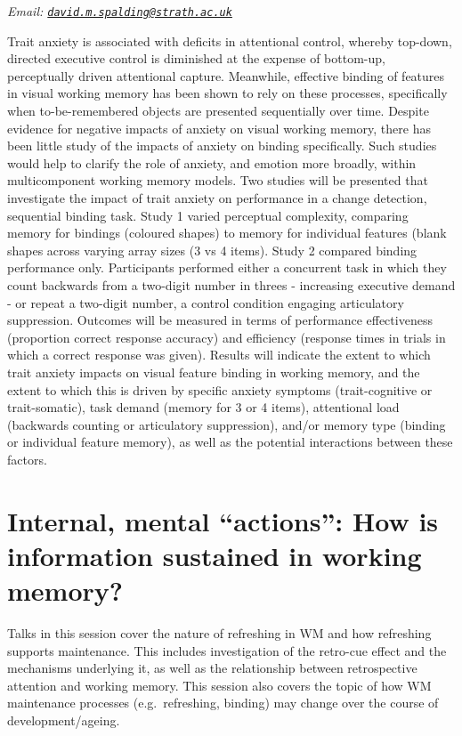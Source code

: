 \documentclass[
  12pt,
]{book}
\begin{document}
\emph{Email: \href{mailto:david.m.spalding@strath.ac.uk}{\nolinkurl{david.m.spalding@strath.ac.uk}}}

Trait anxiety is associated with deficits in attentional control, whereby top-down, directed executive control is diminished at the expense of bottom-up, perceptually driven attentional capture. Meanwhile, effective binding of features in visual working memory has been shown to rely on these processes, specifically when to-be-remembered objects are presented sequentially over time. Despite evidence for negative impacts of anxiety on visual working memory, there has been little study of the impacts of anxiety on binding specifically. Such studies would help to clarify the role of anxiety, and emotion more broadly, within multicomponent working memory models. Two studies will be presented that investigate the impact of trait anxiety on performance in a change detection, sequential binding task. Study 1 varied perceptual complexity, comparing memory for bindings (coloured shapes) to memory for individual features (blank shapes across varying array sizes (3 vs 4 items). Study 2 compared binding performance only. Participants performed either a concurrent task in which they count backwards from a two-digit number in threes - increasing executive demand - or repeat a two-digit number, a control condition engaging articulatory suppression. Outcomes will be measured in terms of performance effectiveness (proportion correct response accuracy) and efficiency (response times in trials in which a correct response was given). Results will indicate the extent to which trait anxiety impacts on visual feature binding in working memory, and the extent to which this is driven by specific anxiety symptoms (trait-cognitive or trait-somatic), task demand (memory for 3 or 4 items), attentional load (backwards counting or articulatory suppression), and/or memory type (binding or individual feature memory), as well as the potential interactions between these factors.

\hypertarget{internal-mental-actions-how-is-information-sustained-in-working-memory}{%
\chapter{Internal, mental ``actions'': How is information sustained in working memory?}\label{internal-mental-actions-how-is-information-sustained-in-working-memory}}

Talks in this session cover the nature of refreshing in WM and how refreshing supports maintenance. This includes investigation of the retro-cue effect and the mechanisms underlying it, as well as the relationship between retrospective attention and working memory. This session also covers the topic of how WM maintenance processes (e.g.~refreshing, binding) may change over the course of development/ageing.
\end{document}
